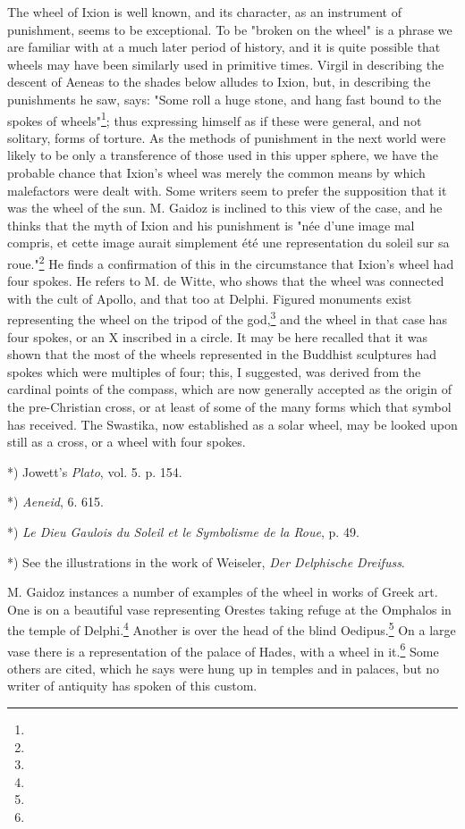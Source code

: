 \documentclass[a4paper, 11pt, oneside, polutonikogreek, english]{article}
\begin{document}
The wheel of Ixion is well known, and its character, as an instrument of punishment, seems to be exceptional. To be "broken on the wheel" is a phrase we are familiar with at a much later period of history, and it is quite possible that wheels may have been similarly used in primitive times. Virgil in describing the descent of Aeneas to the shades below alludes to Ixion, but, in describing the punishments he saw, says: "Some roll a huge stone, and hang fast bound to the spokes of wheels"\footnote{}; thus expressing himself as if these were general, and not solitary, forms of torture. As the methods of punishment in the next world were likely to be only a transference of those used in this upper sphere, we have the probable chance that Ixion's wheel was merely the common means by which malefactors were dealt with. Some writers seem to prefer the supposition that it was the wheel of the sun. M. Gaidoz is inclined to this view of the case, and he thinks that the myth of Ixion and his punishment is "née d'une image mal compris, et cette image aurait simplement été une representation du soleil sur sa roue."\footnote{} He finds a confirmation of this in the circumstance that Ixion's wheel had four spokes. He refers to M. de Witte, who shows that the wheel was connected with the cult of Apollo, and that too at Delphi. Figured monuments exist representing the wheel on the tripod of the god,\footnote{} and the wheel in that case has four spokes, or an X inscribed in a circle. It may be here recalled that it was shown that the most of the wheels represented in the Buddhist sculptures had spokes which were multiples of four; this, I suggested, was derived from the cardinal points of the compass, which are now generally accepted as the origin of the pre-Christian cross, or at least of some of the many forms which that symbol has received. The Swastika, now established as a solar wheel, may be looked upon still as a cross, or a wheel with four spokes.

*) Jowett's \emph{Plato}, vol. 5. p. 154.

*) \emph{Aeneid}, 6. 615.

*) \emph{Le Dieu Gaulois du Soleil et le Symbolisme de la Roue}, p. 49.

*) See the illustrations in the work of Weiseler, \emph{Der Delphische Dreifuss}.

M. Gaidoz instances a number of examples of the wheel in works of Greek art. One is on a beautiful vase representing Orestes taking refuge at the Omphalos in the temple of Delphi.\footnote{} Another is over the head of the blind Oedipus.\footnote{} On a large vase there is a representation of the palace of Hades, with a wheel in it.\footnote{} Some others are cited, which he says were hung up in temples and in palaces, but no writer of antiquity has spoken of this custom.
\end{document}
